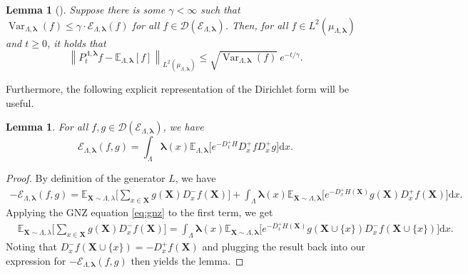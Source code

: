 \documentclass[10pt]{amsart}
\newtheorem{lemma}[theorem]{Lemma}
\theoremstyle{definition}
\theoremstyle{remark}
\newcommand{\dirichlet}{\mathcal{E}}
\newcommand{\bX}{\mathbf{X}}
\newcommand{\E}{\mathbb{E}}
\newcommand{\region}{\Lambda}
\newcommand{\activity}{\lambda}
\newcommand{\activities}{\pmb{\lambda}}
\newcommand{\diff}{\mathrm{d}}
\newcommand{\domain}{\mathcal{D}}
\newcommand{\norm}[1]{\left\lVert#1\right\rVert}
\newcommand{\Var}{{\operatorname{Var}}}
\begin{document}
	\begin{lemma}[{\cite[Theorem 4.2.5]{bakry2013analysis}}] \label{lemma:L2_contraction}
		Suppose there is some $\gamma < \infty$ such that $\Var_{\region, \activities}(f) \leq \gamma \cdot \dirichlet_{\region, \activities}(f)$ for all $f \in \domain(\dirichlet_{\region, \activities})$.
		Then, for all $f \in L^2(\mu_{\region, \activities})$ and $t \ge 0$, it holds that 
		\[
		\norm{P_t^{\region, \activities} f - \E_{\region, \activities}[f]}_{L^2(\mu_{\region, \activities})} \le \sqrt{\Var_{\region, \activities}(f)} \ e^{-t/\gamma} .
		\]
	\end{lemma}
	
	Furthermore, the following explicit representation of the Dirichlet form will be useful.
	\begin{lemma}\label{lem:dirichlet_explicit}
		For all $f,g \in \domain(\dirichlet_{\region, \activities})$, we have 
		$$
		\dirichlet_{\region, \activities}(f, g) = \int_{\region} \activities(x) \E_{\region, \activities} \big[  e^{-D_x^+ H} D_x^+f D_x^+g  \big] \diff x.
		$$
	\end{lemma}
	\begin{proof}
		By definition of the generator $L$, we have 
		\begin{align*}
			-\dirichlet_{\region, \activities}(f, g) = \E_{\bX \sim \region, \activity}\Big[\sum_{x \in \bX}g(\bX)D_x^-f(\bX)\Big] + \int_{\region} \activities(x) \E_{\bX\sim\region, \activities} \big[  e^{-D_x^+ H(\bX)} g(\bX)D_x^+f(\bX)  \big] \diff x.
		\end{align*} Applying the GNZ equation \eqref{eq:gnz} to the first term, we get 
		\begin{align*}
			&\E_{\bX \sim \region, \activity}\Big[\sum_{x \in \bX}g(\bX)D_x^-f(\bX)\Big] = \int_{\region} \activities(x) \E_{\bX\sim\region, \activities} \big[  e^{-D_x^+ H(\bX)} g(\bX \cup \{x\})D_x^-f(\bX \cup \{x\})  \big] \diff x.
		\end{align*}
		Noting that $D_x^-f(\bX \cup \{x\}) = -D_x^+f(\bX)$ and plugging the result back into our expression for $-\dirichlet_{\region, \activities}(f,g)$ then yields the lemma. 
	\end{proof}
	
	
\end{document}
